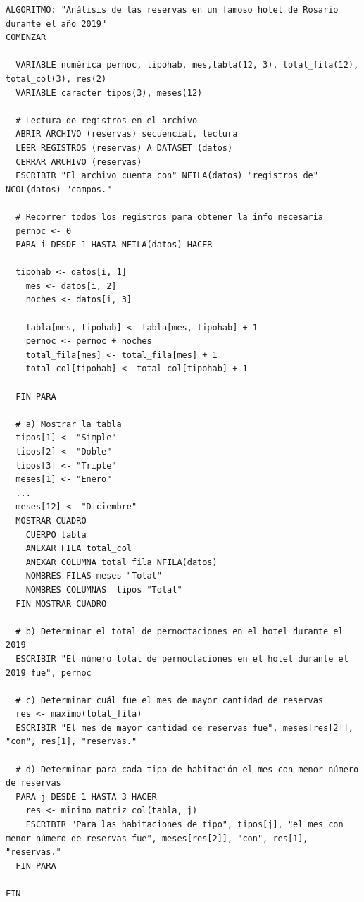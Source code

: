 \documentclass[
]{book}
\begin{document}
\begin{verbatim}
ALGORITMO: "Análisis de las reservas en un famoso hotel de Rosario durante el año 2019"
COMENZAR
    
  VARIABLE numérica pernoc, tipohab, mes,tabla(12, 3), total_fila(12), total_col(3), res(2)
  VARIABLE caracter tipos(3), meses(12)

  # Lectura de registros en el archivo
  ABRIR ARCHIVO (reservas) secuencial, lectura
  LEER REGISTROS (reservas) A DATASET (datos)
  CERRAR ARCHIVO (reservas)
  ESCRIBIR "El archivo cuenta con" NFILA(datos) "registros de" NCOL(datos) "campos." 

  # Recorrer todos los registros para obtener la info necesaria
  pernoc <- 0
  PARA i DESDE 1 HASTA NFILA(datos) HACER
    
  tipohab <- datos[i, 1]
    mes <- datos[i, 2]
    noches <- datos[i, 3]
    
    tabla[mes, tipohab] <- tabla[mes, tipohab] + 1
    pernoc <- pernoc + noches
    total_fila[mes] <- total_fila[mes] + 1
    total_col[tipohab] <- total_col[tipohab] + 1
    
  FIN PARA

  # a) Mostrar la tabla
  tipos[1] <- "Simple"
  tipos[2] <- "Doble"
  tipos[3] <- "Triple"
  meses[1] <- "Enero"
  ...
  meses[12] <- "Diciembre"
  MOSTRAR CUADRO
    CUERPO tabla
    ANEXAR FILA total_col
    ANEXAR COLUMNA total_fila NFILA(datos)
    NOMBRES FILAS meses "Total"
    NOMBRES COLUMNAS  tipos "Total"
  FIN MOSTRAR CUADRO

  # b) Determinar el total de pernoctaciones en el hotel durante el 2019
  ESCRIBIR "El número total de pernoctaciones en el hotel durante el 2019 fue", pernoc

  # c) Determinar cuál fue el mes de mayor cantidad de reservas
  res <- maximo(total_fila)
  ESCRIBIR "El mes de mayor cantidad de reservas fue", meses[res[2]], "con", res[1], "reservas."

  # d) Determinar para cada tipo de habitación el mes con menor número de reservas
  PARA j DESDE 1 HASTA 3 HACER
    res <- minimo_matriz_col(tabla, j)
    ESCRIBIR "Para las habitaciones de tipo", tipos[j], "el mes con menor número de reservas fue", meses[res[2]], "con", res[1], "reservas."
  FIN PARA
   
FIN
\end{verbatim}
\end{document}
